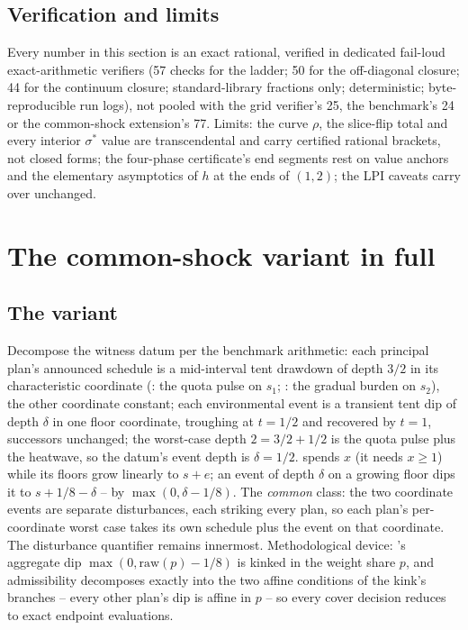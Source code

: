 \subsection{Verification and limits}

Every number in this section is an exact rational, verified in dedicated fail-loud exact-arithmetic verifiers (57 checks for the ladder; 50 for the off-diagonal closure; 44 for the continuum closure; standard-library fractions only; deterministic; byte-reproducible run logs), not pooled with the grid verifier's 25, the benchmark's 24 or the common-shock extension's 77. Limits: the curve $\rho$, the slice-flip total and every interior $\sigma^*$ value are transcendental and carry certified rational brackets, not closed forms; the four-phase certificate's end segments rest on value anchors and the elementary asymptotics of $h$ at the ends of $(1,2)$; the LPI caveats carry over unchanged.

\section{The common-shock variant in full}\label{si:commonshock}

\subsection{The variant}

Decompose the witness datum per the benchmark arithmetic: each principal plan's announced schedule is a mid-interval tent drawdown of depth $3/2$ in its characteristic coordinate (: the quota pulse on $s_1$; : the gradual burden on $s_2$), the other coordinate constant; each environmental event is a transient tent dip of depth $\delta$ in one floor coordinate, troughing at $t=1/2$ and recovered by $t=1$, successors unchanged; the worst-case depth $2=3/2+1/2$ is the quota pulse plus the heatwave, so the datum's event depth is $\delta=1/2$.  spends $x$ (it needs $x\ge1$) while its floors grow linearly to $s+e$; an event of depth $\delta$ on a growing floor dips it to $s+1/8-\delta$ -- by $\max(0,\delta-1/8)$. The \emph{common} class: the two coordinate events are separate disturbances, each striking every plan, so each plan's per-coordinate worst case takes its own schedule plus the event on that coordinate. The disturbance quantifier remains innermost. Methodological device: 's aggregate dip $\max(0,\mathrm{raw}(p)-1/8)$ is kinked in the weight share $p$, and admissibility decomposes exactly into the two affine conditions of the kink's branches -- every other plan's dip is affine in $p$ -- so every cover decision reduces to exact endpoint evaluations.

